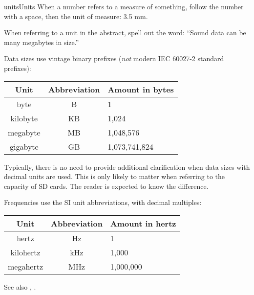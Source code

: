 \begin{sgentry}{units}{Units}
    When a number refers to a measure of something, follow the number with a space, then the unit of measure: 3.5 mm.

    When referring to a unit in the abstract, spell out the word: ``Sound data can be many megabytes in size.''

    Data sizes use vintage binary prefixes (\emph{not} modern IEC 60027-2 standard prefixes):

    \begin{center}
    \begin{tabular}{|c|c|l|}
        \hline
        \textbf{Unit} & \textbf{Abbreviation} & \textbf{Amount in bytes} \\
        \hline
        byte & B & 1 \\
        kilobyte & KB & 1,024 \\
        megabyte & MB & 1,048,576 \\
        gigabyte & GB & 1,073,741,824 \\
        \hline
    \end{tabular}
    \end{center}

    Typically, there is no need to provide additional clarification when data sizes with decimal units are used. This is only likely to matter when referring to the capacity of SD cards. The reader is expected to know the difference.

    Frequencies use the SI unit abbreviations, with decimal multiples:

    \begin{center}
    \begin{tabular}{|c|c|l|}
        \hline
        \textbf{Unit} & \textbf{Abbreviation} & \textbf{Amount in hertz} \\
        \hline
        hertz & Hz & 1 \\
        kilohertz & kHz & 1,000 \\
        megahertz & MHz & 1,000,000 \\
        \hline
    \end{tabular}
    \end{center}

    See also , .
\end{sgentry}

